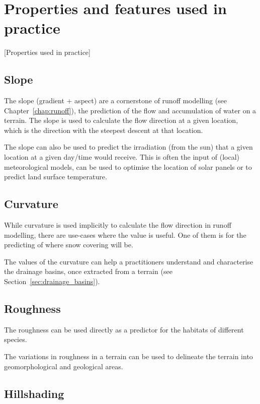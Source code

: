 %
\section{Properties and features used in practice}[Properties used in practice]


\subsection{Slope}%

The slope (gradient + aspect) are a cornerstone of runoff modelling (see Chapter~\ref{chap:runoff}), the prediction of the flow and accumulation of water on a terrain.
The slope is used to calculate the flow direction at a given location, which is the direction with the steepest descent at that location.

%

The slope can also be used to predict the irradiation (from the sun) that a given location at a given day/time would receive.
This is often the input of (local) meteorological models, can be used to optimise the location of solar panels or to predict land surface temperature.


\subsection{Curvature}%

While curvature is used implicitly to calculate the flow direction in runoff modelling, there are use-cases where the value is useful.
One of them is for the predicting of where snow covering will be.

The values of the curvature can help a practitioners understand and characterise the drainage basins, once extracted from a terrain (see Section~\ref{sec:drainage_basins}).



\subsection{Roughness}%

The roughness can be used directly as a predictor for the habitats of different species.

The variations in roughness in a terrain can be used to delineate the terrain into geomorphological and geological areas.


\subsection{Hillshading}%


